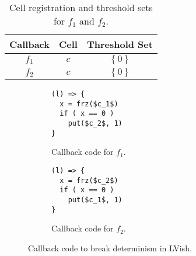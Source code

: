 \begin{table}
  \centering
  \begin{tabular}{c|c|c}
    Callback & Cell & Threshold Set \\
    \hline
    $f_1$ & $c$ & $\left\{ 0 \right\}$ \\
    $f_2$ & $c$ & $\left\{ 0 \right\}$ \\
  \end{tabular}
  \caption{Cell registration and threshold sets for $f_1$ and $f_2$.}
  \label{tab:cellreg}
\end{table}
\begin{figure}
  \centering
  \begin{subfigure}[t]{0.4\textwidth}
    \begin{lstlisting}[mathescape=true]
(l) => {
  x = frz($c_1$)
  if ( x == 0 )
    put($c_2$, 1)
}
    \end{lstlisting}
    \caption{Callback code for $f_1$.}
  \end{subfigure}
  \quad
  \begin{subfigure}[t]{0.4\textwidth}
    \begin{lstlisting}[mathescape=true]
(l) => {
  x = frz($c_2$)
  if ( x == 0 )
    put($c_1$, 1)
}
    \end{lstlisting}
    \caption{Callback code for $f_2$.}
  \end{subfigure}
  \caption{Callback code to break determinism in LVish.}
  \label{fig:lvish_fun_breaking}
\end{figure}

